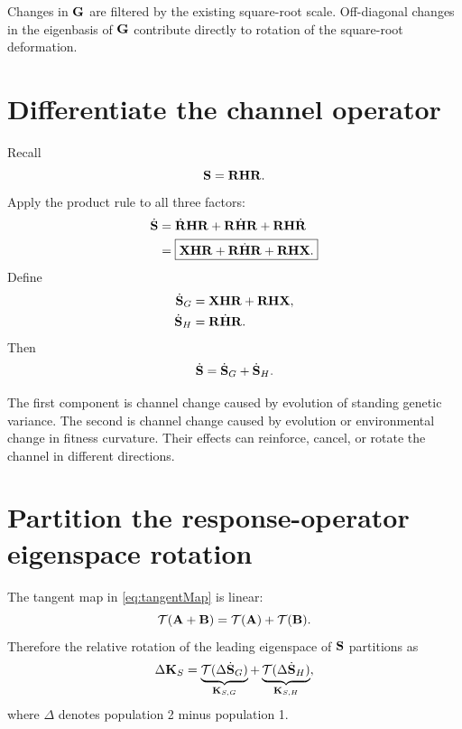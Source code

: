 \inwords Changes in \(\mathbf{G}\) are filtered by the existing square-root scale. Off-diagonal changes in the eigenbasis of \(\mathbf{G}\) contribute directly to rotation of the square-root deformation.

\section{Differentiate the channel operator}

Recall
\begin{equation}
\mathbf{S}=\mathbf{R}\mathbf{H}\mathbf{R}.
\end{equation}
Apply the product rule to all three factors:
\begin{align}
\dot{\mathbf{S}}
&=\dot{\mathbf{R}}\mathbf{H}\mathbf{R}
+\mathbf{R}\dot{\mathbf{H}}\mathbf{R}
+\mathbf{R}\mathbf{H}\dot{\mathbf{R}}\\
&=\boxed{
\mathbf X\mathbf{H}\mathbf{R}
+\mathbf{R}\dot{\mathbf{H}}\mathbf{R}
+\mathbf{R}\mathbf{H}\mathbf X.}
\label{eq:SdotPartition}
\end{align}
Define
\begin{align}
\dot{\mathbf{S}}_G
&=\mathbf X\mathbf{H}\mathbf{R}+\mathbf{R}\mathbf{H}\mathbf X,\\
\dot{\mathbf{S}}_H
&=\mathbf{R}\dot{\mathbf{H}}\mathbf{R}.
\end{align}
Then
\begin{equation}
\dot{\mathbf{S}}=\dot{\mathbf{S}}_G+\dot{\mathbf{S}}_H.
\end{equation}

\begin{biobox}
The first component is channel change caused by evolution of standing genetic variance. The second is channel change caused by evolution or environmental change in fitness curvature. Their effects can reinforce, cancel, or rotate the channel in different directions.
\end{biobox}

\section{Partition the response-operator eigenspace rotation}

The tangent map in \cref{eq:tangentMap} is linear:
\begin{equation}
\mathcal T(\mathbf{A}+\mathbf{B})=\mathcal T(\mathbf{A})+\mathcal T(\mathbf{B}).
\end{equation}
Therefore the relative rotation of the leading eigenspace of \(\mathbf{S}\) partitions as
\begin{equation}
\Delta\mathbf K_S
=\underbrace{\mathcal T(\Delta\dot{\mathbf{S}}_G)}_{\mathbf K_{S,G}}
+\underbrace{\mathcal T(\Delta\dot{\mathbf{S}}_H)}_{\mathbf K_{S,H}},
\label{eq:KpartitionGH}
\end{equation}
where \(\Delta\) denotes population 2 minus population 1.


